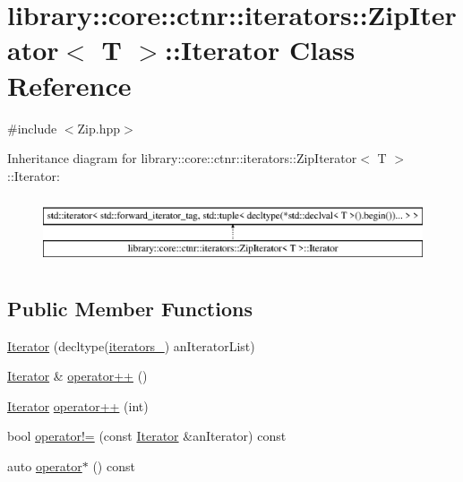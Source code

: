 \hypertarget{classlibrary_1_1core_1_1ctnr_1_1iterators_1_1_zip_iterator_1_1_iterator}{}\section{library\+::core\+::ctnr\+::iterators\+::Zip\+Iterator$<$ T $>$\+::Iterator Class Reference}
\label{classlibrary_1_1core_1_1ctnr_1_1iterators_1_1_zip_iterator_1_1_iterator}


{\ttfamily \#include $<$Zip.\+hpp$>$}

Inheritance diagram for library\+::core\+::ctnr\+::iterators\+::Zip\+Iterator$<$ T $>$\+::Iterator\+:\begin{figure}[H]
\begin{center}
\leavevmode
\includegraphics[height=2.000000cm]{classlibrary_1_1core_1_1ctnr_1_1iterators_1_1_zip_iterator_1_1_iterator}
\end{center}
\end{figure}
\subsection*{Public Member Functions}
\begin{DoxyCompactItemize}
\item 
\mbox{\hyperlink{classlibrary_1_1core_1_1ctnr_1_1iterators_1_1_zip_iterator_1_1_iterator_ab93e780bb41bdb0fbce8e852138051a4}{Iterator}} (decltype(\mbox{\hyperlink{classlibrary_1_1core_1_1ctnr_1_1iterators_1_1_zip_iterator_1_1_iterator_a37c838a652996c4a8d140f1cc3804e4a}{iterators\+\_\+}}) an\+Iterator\+List)
\item 
\mbox{\hyperlink{classlibrary_1_1core_1_1ctnr_1_1iterators_1_1_zip_iterator_1_1_iterator}{Iterator}} \& \mbox{\hyperlink{classlibrary_1_1core_1_1ctnr_1_1iterators_1_1_zip_iterator_1_1_iterator_ab41c609c9afe7e62fe6e4cceaa709771}{operator++}} ()
\item 
\mbox{\hyperlink{classlibrary_1_1core_1_1ctnr_1_1iterators_1_1_zip_iterator_1_1_iterator}{Iterator}} \mbox{\hyperlink{classlibrary_1_1core_1_1ctnr_1_1iterators_1_1_zip_iterator_1_1_iterator_abd2db3105f0aeedec986c6db965ba16f}{operator++}} (int)
\item 
bool \mbox{\hyperlink{classlibrary_1_1core_1_1ctnr_1_1iterators_1_1_zip_iterator_1_1_iterator_ae3e898d5e9a5f0aa7f1f076de6af8063}{operator!=}} (const \mbox{\hyperlink{classlibrary_1_1core_1_1ctnr_1_1iterators_1_1_zip_iterator_1_1_iterator}{Iterator}} \&an\+Iterator) const
\item 
auto \mbox{\hyperlink{classlibrary_1_1core_1_1ctnr_1_1iterators_1_1_zip_iterator_1_1_iterator_a34082110fb060868a9e15bc1b5c475a1}{operator$\ast$}} () const
\end{DoxyCompactItemize}
